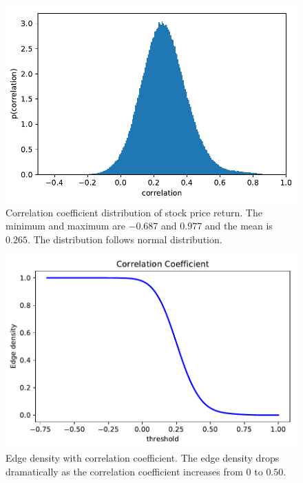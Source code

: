 \begin{figure}
	\begin{center}
		\includegraphics[width=14cm]{correlation_distribution}
	\end{center}
	\caption{Correlation coefficient distribution of stock price return. The minimum and maximum are $-0.687$ and $0.977$ and the mean is $0.265$. The distribution follows normal distribution.}
	\label{fig:correlation_distribution}  
\end{figure}

\begin{figure}
	\begin{center}
		\includegraphics[width=14cm]{correlation_edge_density}
	\end{center}
	\caption{Edge density with correlation coefficient. The edge density drops dramatically as the correlation coefficient increases from $0$ to $0.50$.}
	\label{fig:correlation_edge_density}  
\end{figure}


